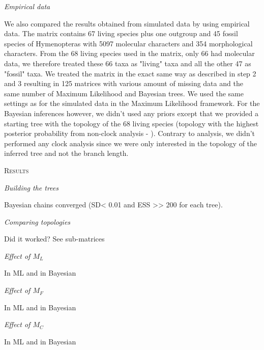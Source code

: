 \documentclass[12pt,letterpaper]{article}
\renewcommand{\section}[1]{%
\bigskip
\begin{center}
\begin{Large}
\normalfont\scshape #1
\medskip
\end{Large}
\end{center}}
\renewcommand{\subsection}[1]{%
\bigskip
\begin{center}
\begin{large}
\normalfont\itshape #1
\end{large}
\end{center}}
\begin{document}
\subsection{Empirical data} %
We also compared the results obtained from simulated data by using \citet{ronquista2012} empirical data.
The matrix contains 67 living species plus one outgroup and 45 fossil species of Hymenopteras with 5097 molecular characters and 354 morphological characters.
From the 68 living species used in the matrix, only 66 had molecular data, we therefore treated these 66 taxa as "living" taxa and all the other 47 as "fossil" taxa.
We treated the matrix in the exact same way as described in step 2 and 3 resulting in 125 matrices with various amount of missing data and the same number of Maximum Likelihood and Bayesian trees.
We used the same settings as for the simulated data in the Maximum Likelihood framework.
For the Bayesian inferences however, we didn’t used any priors except that we provided a starting tree with the topology of the 68 living species (topology with the highest posterior probability from non-clock analysis - \citet{ronquista2012}).
Contrary to \citet{ronquista2012} analysis, we didn’t performed any clock analysis since we were only interested in the topology of the inferred tree and not the branch length.

\section{Results}
\subsection{Building the trees}
Bayesian chains converged (SD< 0.01 and ESS >> 200 for each tree).
\subsection{Comparing topologies}
Did it worked? See sub-matrices
\subsection{Effect of $M_L$}
In ML and in Bayesian
\subsection{Effect of $M_F$}
In ML and in Bayesian
\subsection{Effect of $M_C$}
In ML and in Bayesian
\end{document}
